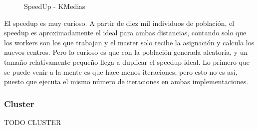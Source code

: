 		\begin{figure}[!h]
		\centering
		\caption{SpeedUp - KMedias}
		\end{figure}
		
		El speedup es muy curioso. A partir de diez mil individuos de población, el speedup es aproximadamente el ideal para ambas distancias, contando solo que los workers son los que trabajan y el master solo recibe la asignación y calcula los nuevos centros. Pero lo curioso es que con la población generada aleatoria, y un tamaño relativamente pequeño llega a duplicar el speedup ideal. Lo primero que se puede venir a la mente es que hace menos iteraciones, pero esto no es así, puesto que ejecuta el mismo número de iteraciones en ambas implementaciones. 
		
		
		
	
		
		\newpage
		
		\subsubsection{Cluster}

		
		\color{blue} TODO CLUSTER
		
		\color{black}
		
		\newpage

